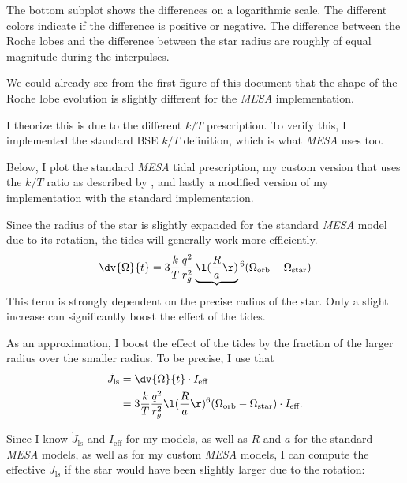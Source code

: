 \documentclass[a4paper,10pt]{article}
\begin{document}
The bottom subplot shows the differences on a logarithmic scale. The different colors indicate if the difference is positive or negative.
The difference between the Roche lobes and the difference between the star radius are roughly of equal magnitude during the interpulses.

We could already see from the first figure of this document that the shape of the Roche lobe evolution is slightly different for the \emph{MESA} implementation.

I theorize this is due to the different \(k / T\) prescription. To verify this, I implemented the standard \citet{hurley1902} BSE \(k / T\) definition, which is what \emph{MESA} uses too. 

Below, I plot the standard \emph{MESA} tidal prescription, my custom version that uses the \(k / T\) ratio as described by \citet{preece2022}, and lastly a modified version of my implementation with the standard \citet{hurley1902} implementation.

\begin{figure}[ht]
    \centering
\end{figure}

Since the radius of the star is slightly expanded for the standard \emph{MESA} model due to its rotation, the tides will generally work more efficiently.
\begin{equation*}
    \dv{\Omega}{t} = 3 \frac{k}{T} \frac{q^{2} }{r_{g}^{2}  }\underbrace{\l(\frac{R}{a}\r)}{}^{6}(\Omega_\text{orb} - \Omega_\text{star})
\end{equation*}
This term is strongly dependent on the precise radius of the star. Only a slight increase can significantly boost the effect of the tides.

As an approximation, I boost the effect of the tides by the fraction of the larger radius over the smaller radius. To be precise, I use that
\begin{align*}
    \dot{J}_\text{ls} &= \dv{\Omega}{t} \cdot I_\text{eff}\\
                      &= 3 \frac{k}{T} \frac{q^{2} }{r_{g}^{2}  }\l(\frac{R}{a}\r)^{6}(\Omega_\text{orb} - \Omega_\text{star}) \cdot I_\text{eff}.
\end{align*}

Since I know \(\dot{J}_\text{ls}\) and \(I_\text{eff}\) for my models, as well as \(R\) and \(a\) for the standard \emph{MESA} models, as well as for my custom \emph{MESA} models, I can compute the effective \(\dot{J}_\text{ls}\) if the star would have been slightly larger due to the rotation:
\end{document}
